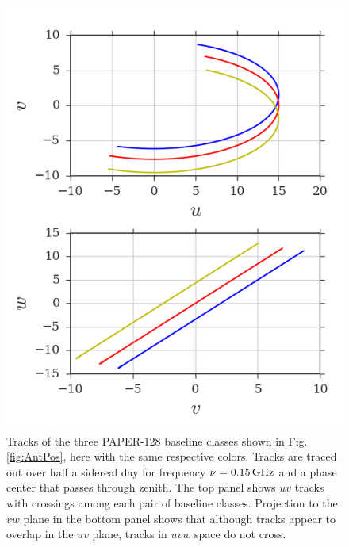 \documentclass[twocolumn,apj,numberedappendix]{emulateapj}
\renewcommand\[{\begin{equation}}
\renewcommand\]{\end{equation}}
\begin{document}
\begin{figure}[h]
\includegraphics[width=\linewidth]{rotation_new}
\caption{Tracks of the three PAPER-128 baseline classes shown in Fig. \ref{fig:AntPos}, here with the same respective colors. Tracks are traced out over half a sidereal day for frequency $\nu=0.15\text{\,GHz}$ and a phase center that passes through zenith. The top panel shows $uv$ tracks with crossings among each pair of baseline classes. Projection to the $vw$ plane in the bottom panel shows that although tracks appear to overlap in the $uv$ plane, tracks in $uvw$ space do not cross. }
\label{fig:Tracks}
\end{figure}
\end{document}
